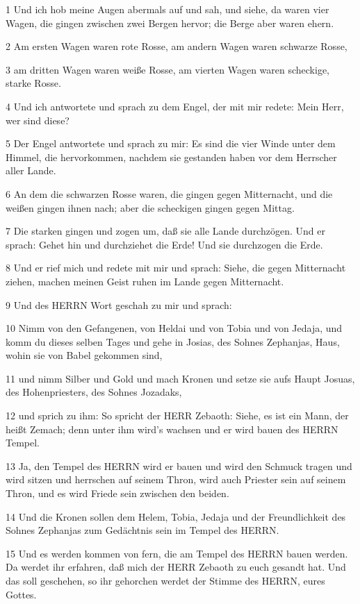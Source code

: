 \par 1 Und ich hob meine Augen abermals auf und sah, und siehe, da waren vier Wagen, die gingen zwischen zwei Bergen hervor; die Berge aber waren ehern.
\par 2 Am ersten Wagen waren rote Rosse, am andern Wagen waren schwarze Rosse,
\par 3 am dritten Wagen waren weiße Rosse, am vierten Wagen waren scheckige, starke Rosse.
\par 4 Und ich antwortete und sprach zu dem Engel, der mit mir redete: Mein Herr, wer sind diese?
\par 5 Der Engel antwortete und sprach zu mir: Es sind die vier Winde unter dem Himmel, die hervorkommen, nachdem sie gestanden haben vor dem Herrscher aller Lande.
\par 6 An dem die schwarzen Rosse waren, die gingen gegen Mitternacht, und die weißen gingen ihnen nach; aber die scheckigen gingen gegen Mittag.
\par 7 Die starken gingen und zogen um, daß sie alle Lande durchzögen. Und er sprach: Gehet hin und durchziehet die Erde! Und sie durchzogen die Erde.
\par 8 Und er rief mich und redete mit mir und sprach: Siehe, die gegen Mitternacht ziehen, machen meinen Geist ruhen im Lande gegen Mitternacht.
\par 9 Und des HERRN Wort geschah zu mir und sprach:
\par 10 Nimm von den Gefangenen, von Heldai und von Tobia und von Jedaja, und komm du dieses selben Tages und gehe in Josias, des Sohnes Zephanjas, Haus, wohin sie von Babel gekommen sind,
\par 11 und nimm Silber und Gold und mach Kronen und setze sie aufs Haupt Josuas, des Hohenpriesters, des Sohnes Jozadaks,
\par 12 und sprich zu ihm: So spricht der HERR Zebaoth: Siehe, es ist ein Mann, der heißt Zemach; denn unter ihm wird's wachsen und er wird bauen des HERRN Tempel.
\par 13 Ja, den Tempel des HERRN wird er bauen und wird den Schmuck tragen und wird sitzen und herrschen auf seinem Thron, wird auch Priester sein auf seinem Thron, und es wird Friede sein zwischen den beiden.
\par 14 Und die Kronen sollen dem Helem, Tobia, Jedaja und der Freundlichkeit des Sohnes Zephanjas zum Gedächtnis sein im Tempel des HERRN.
\par 15 Und es werden kommen von fern, die am Tempel des HERRN bauen werden. Da werdet ihr erfahren, daß mich der HERR Zebaoth zu euch gesandt hat. Und das soll geschehen, so ihr gehorchen werdet der Stimme des HERRN, eures Gottes.

